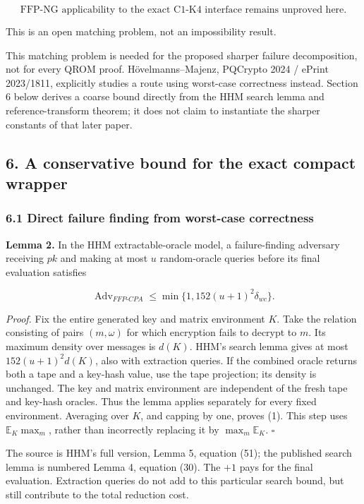 \documentclass[11pt,a4paper]{article}
\begin{document}
\[
\boxed{\text{FFP-NG applicability to the exact C1-K4 interface remains unproved here.}}
\]

This is an open matching problem, not an impossibility result.

This matching problem is needed for the proposed sharper failure decomposition, not for every QROM proof. Hövelmanns--Majenz, PQCrypto 2024 / ePrint 2023/1811, explicitly studies a route using worst-case correctness instead. Section 6 below derives a coarse bound directly from the HHM search lemma and reference-transform theorem; it does not claim to instantiate the sharper constants of that later paper.

\subsection{6. A conservative bound for the exact compact wrapper}\label{a-conservative-bound-for-the-exact-compact-wrapper}

\subsubsection{6.1 Direct failure finding from worst-case correctness}\label{direct-failure-finding-from-worst-case-correctness}

\textbf{Lemma 2.} In the HHM extractable-oracle model, a failure-finding adversary receiving \(pk\) and making at most \(u\) random-oracle queries before its final evaluation satisfies

\[
\operatorname{Adv}_{FFP\text{-}CPA}
\le \min\{1,152(u+1)^2\delta_{wc}\}.
\tag{1}
\]

\emph{Proof.} Fix the entire generated key and matrix environment \(K\). Take the relation consisting of pairs \((m,\omega)\) for which encryption fails to decrypt to \(m\). Its maximum density over messages is \(d(K)\). HHM's search lemma gives at most \(152(u+1)^2d(K)\), also with extraction queries. If the combined oracle returns both a tape and a key-hash value, use the tape projection; its density is unchanged. The key and matrix environment are independent of the fresh tape and key-hash oracles. Thus the lemma applies separately for every fixed environment. Averaging over \(K\), and capping by one, proves (1). This step uses \(\mathbb E_K\max_m\), rather than incorrectly replacing it by \(\max_m\mathbb E_K\). \(\square\)

The source is HHM's full version, Lemma 5, equation (51); the published search lemma is numbered Lemma 4, equation (30). The \(+1\) pays for the final evaluation. Extraction queries do not add to this particular search bound, but still contribute to the total reduction cost.
\end{document}
